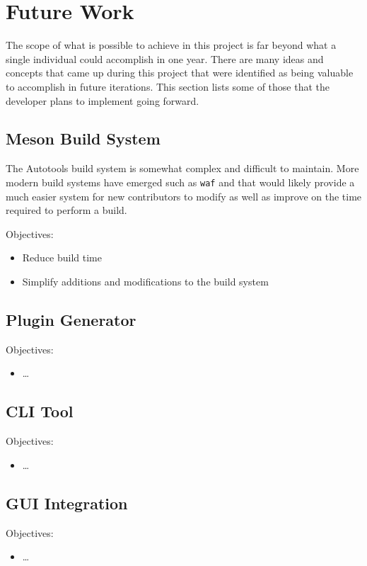 \section{Future Work}\label{sec:future}

  The scope of what is possible to achieve in this project is far beyond what a
  single individual could accomplish in one year. There are many ideas and
  concepts that came up during this project that were identified as being
  valuable to accomplish in future iterations. This section lists some of those
  that the developer plans to implement going forward.

  \subsection{Meson Build System}\label{sec:future-meson}

    The Autotools build system is somewhat complex and difficult to maintain.
    More modern build systems have emerged such as \texttt{waf} and
     that would likely provide a much easier system for new
    contributors to modify as well as improve on the time required to perform a
    build.

    Objectives:

    \begin{itemize}
      \item Reduce build time
      \item Simplify additions and modifications to the build system
    \end{itemize}

  \subsection{Plugin Generator}\label{sec:future-plugin-generator}

    Objectives:

    \begin{itemize}
      \item \ldots
    \end{itemize}

  \subsection{CLI Tool}\label{sec:future-cli}

    Objectives:

    \begin{itemize}
      \item \ldots
    \end{itemize}

  \subsection{GUI Integration}\label{sec:future-gui}

    Objectives:

    \begin{itemize}
      \item \ldots
    \end{itemize}
